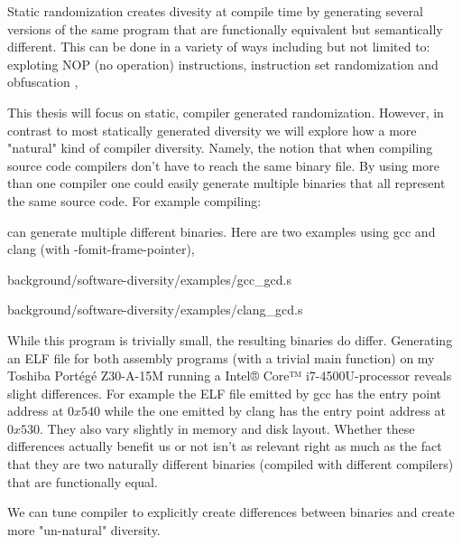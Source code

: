 Static randomization creates divesity at compile time by generating several versions of the
same program that are functionally equivalent but semantically different. This can be done
in a variety of ways including but not limited to: exploting NOP (no operation) instructions,
instruction set randomization and obfuscation \cite[Section~4.1.1]{survey},

This thesis will focus on static, compiler generated randomization. However, in contrast
to most statically generated diversity we will explore how a more "natural" kind of compiler
diversity. Namely, the notion that when compiling source code compilers don't have to reach
the same binary file. By using more than one compiler one could easily generate multiple
binaries that all represent the same source code. For example compiling:



can generate multiple different binaries. Here are two examples using gcc and clang (with
-fomit-frame-pointer),


{background/software-diversity/examples/gcc_gcd.s}


{background/software-diversity/examples/clang_gcd.s}

While this program is trivially small, the resulting binaries do differ. Generating an
ELF file for both assembly programs (with a trivial main function) on my Toshiba Portégé
Z30-A-15M running a Intel® Core™ i7-4500U-processor reveals slight differences. For example
the ELF file emitted by gcc has the entry point address at $0x540$ while the one emitted
by clang has the entry point address at $0x530$. They also vary slightly in memory and
disk layout. Whether these differences actually benefit us or not isn't as relevant right
as much as the fact that they are two naturally different binaries (compiled with different
compilers) that are functionally equal.

We can tune compiler to explicitly create differences between binaries and create more
"un-natural" diversity. 

